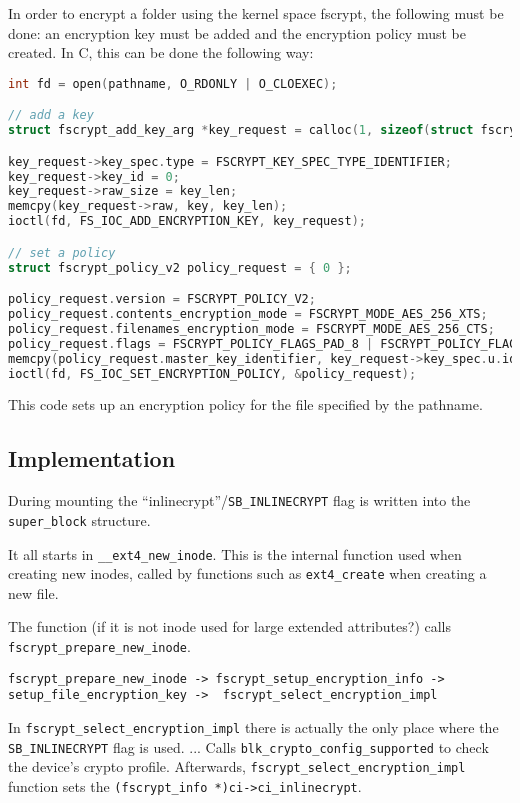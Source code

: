 In order to encrypt a folder using the kernel space fscrypt, the following must be done: an encryption key must be added and the encryption policy must be created. In C, this can be done the following way:
\begin{lstlisting}[language=c]
int fd = open(pathname, O_RDONLY | O_CLOEXEC);

// add a key
struct fscrypt_add_key_arg *key_request = calloc(1, sizeof(struct fscrypt_add_key_arg) + key_len);

key_request->key_spec.type = FSCRYPT_KEY_SPEC_TYPE_IDENTIFIER;
key_request->key_id = 0;
key_request->raw_size = key_len;
memcpy(key_request->raw, key, key_len);
ioctl(fd, FS_IOC_ADD_ENCRYPTION_KEY, key_request);

// set a policy
struct fscrypt_policy_v2 policy_request = { 0 };

policy_request.version = FSCRYPT_POLICY_V2;
policy_request.contents_encryption_mode = FSCRYPT_MODE_AES_256_XTS;
policy_request.filenames_encryption_mode = FSCRYPT_MODE_AES_256_CTS;
policy_request.flags = FSCRYPT_POLICY_FLAGS_PAD_8 | FSCRYPT_POLICY_FLAGS_PAD_16 | FSCRYPT_POLICY_FLAGS_PAD_32;
memcpy(policy_request.master_key_identifier, key_request->key_spec.u.identifier, FSCRYPT_KEY_IDENTIFIER_SIZE);
ioctl(fd, FS_IOC_SET_ENCRYPTION_POLICY, &policy_request);
\end{lstlisting}
This code sets up an encryption policy for the file specified by the pathname. 

\subsection{Implementation}

During mounting the ``inlinecrypt''/\verb|SB_INLINECRYPT|  flag is written into the \verb|super_block| structure.

It all starts in \verb|__ext4_new_inode|. This is the internal function used when creating new inodes, called by functions such as \verb|ext4_create| when creating a new file.

The function (if it is not inode used for large extended attributes?) calls \verb|fscrypt_prepare_new_inode|.

\verb|fscrypt_prepare_new_inode -> fscrypt_setup_encryption_info ->| \verb|setup_file_encryption_key ->  fscrypt_select_encryption_impl|

In \verb|fscrypt_select_encryption_impl| there is actually the only place where the \verb|SB_INLINECRYPT| flag is used.
... Calls \verb|blk_crypto_config_supported| to check the device's crypto profile.
Afterwards, \verb|fscrypt_select_encryption_impl| function sets the \verb|(fscrypt_info *)ci->ci_inlinecrypt|.

